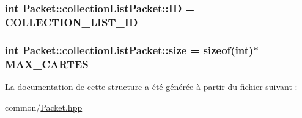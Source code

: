 \subsubsection[{I\+D}]{\setlength{\rightskip}{0pt plus 5cm}int Packet\+::collection\+List\+Packet\+::\+I\+D = {\bf C\+O\+L\+L\+E\+C\+T\+I\+O\+N\+\_\+\+L\+I\+S\+T\+\_\+\+I\+D}}\label{structPacket_1_1collectionListPacket_af8e389e458f39647b120772359f4799d}
\hypertarget{structPacket_1_1collectionListPacket_a7e5da725f1892d00962cd8526e4959d7}{}
\subsubsection[{size}]{\setlength{\rightskip}{0pt plus 5cm}int Packet\+::collection\+List\+Packet\+::size = sizeof(int)$\ast${\bf M\+A\+X\+\_\+\+C\+A\+R\+T\+E\+S}}\label{structPacket_1_1collectionListPacket_a7e5da725f1892d00962cd8526e4959d7}


La documentation de cette structure a été générée à partir du fichier suivant \+:\begin{DoxyCompactItemize}
\item 
common/\hyperlink{Packet_8hpp}{Packet.\+hpp}\end{DoxyCompactItemize}
